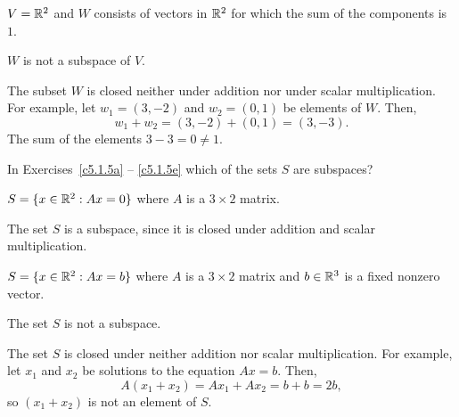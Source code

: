 \documentclass{ximera}
\begin{document}


\problemlabel

\begin{exercise} \label{c5.1.4d}
$V={\mathbb R}^2$ and $W$ consists of vectors in ${\mathbb R}^2$
     for which the sum of the components is $1$.

\begin{solution}
\ans $W$ is not a subspace of $V$.

\soln The subset $W$ is closed neither under addition nor under scalar
multiplication.  For example, let $w_1 = (3,-2)$ and $w_2 = (0,1)$ be
elements of $W$.  Then,
\[
w_1 + w_2 = (3,-2) + (0,1) = (3,-3).
\]
The sum of the elements $3 - 3 = 0 \neq 1$.

\end{solution}
\end{exercise}




\problemlabel

\noindent In Exercises~\ref{c5.1.5a} -- \ref{c5.1.5e} which of the
sets $S$ are subspaces?


\begin{exercise} \label{c5.1.5d}
$S = \{x\in{\mathbb R}^2: Ax=0\}$ where $A$ is a $3\times 2$ matrix.

\begin{solution}
The set $S$ is a subspace, since it is closed under
addition and scalar multiplication.

\end{solution}
\end{exercise}




\problemlabel

\begin{exercise} \label{c5.1.5e}
$S = \{x\in{\mathbb R}^2: Ax=b\}$ where $A$ is a $3\times 2$ matrix
	and $b\in{\mathbb R}^3$ is a fixed nonzero vector.

\begin{solution}
\ans The set $S$ is not a subspace.

\soln The set $S$ is closed under neither addition nor scalar
multiplication.  For example, let $x_1$ and $x_2$ be solutions to the
equation $Ax = b$.  Then,
\[
A(x_1 + x_2) = Ax_1 + Ax_2 = b + b = 2b,
\]
so $(x_1 + x_2)$ is not an element of $S$.

\end{solution}
\end{exercise}


\end{document}
